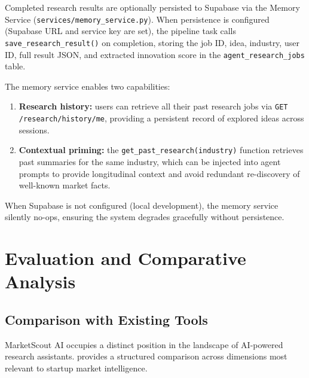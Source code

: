 \documentclass[12pt,a4paper,oneside]{book}
\begin{document}
Completed research results are optionally persisted to Supabase via the Memory
Service (\texttt{services/memory\_service.py}). When persistence is configured
(Supabase URL and service key are set), the pipeline task calls
\texttt{save\_research\_result()} on completion, storing the job ID, idea,
industry, user ID, full result JSON, and extracted innovation score in the
\texttt{agent\_research\_jobs} table.

The memory service enables two capabilities:
\begin{enumerate}
  \item \textbf{Research history:} users can retrieve all their past research jobs
    via \texttt{GET /research/history/me}, providing a persistent record of explored
    ideas across sessions.
  \item \textbf{Contextual priming:} the \texttt{get\_past\_research(industry)} function
    retrieves past summaries for the same industry, which can be injected into agent
    prompts to provide longitudinal context and avoid redundant re-discovery of
    well-known market facts.
\end{enumerate}

When Supabase is not configured (local development), the memory service silently
no-ops, ensuring the system degrades gracefully without persistence.

\chapter{Evaluation and Comparative Analysis}
\label{chap:evaluation}

\section{Comparison with Existing Tools}

MarketScout AI occupies a distinct position in the landscape of AI-powered research assistants.  provides a structured comparison across dimensions most relevant to startup market intelligence.
\end{document}
